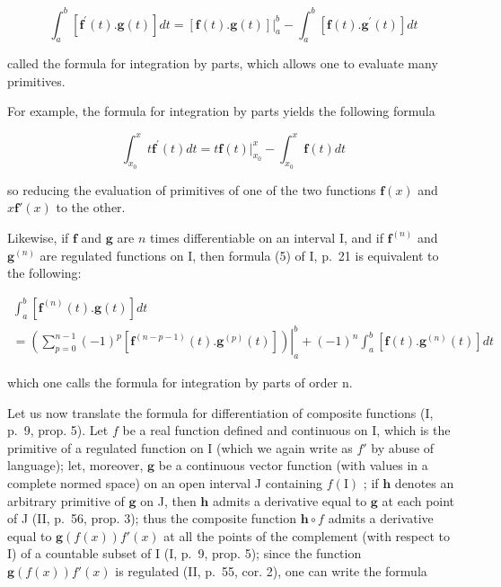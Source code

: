 \[
\int_ {a} ^ {b} [ \mathbf {f} ^ {\prime} (t). \mathbf {g} (t) ] d t = [ \mathbf {f} (t). \mathbf {g} (t) ] \big | _ {a} ^ {b} - \int_ {a} ^ {b} [ \mathbf {f} (t). \mathbf {g} ^ {\prime} (t) ] d t\tag{10}
\]

called the formula for integration by parts, which allows one to evaluate many primitives.

For example, the formula for integration by parts yields the following formula

\[
\int_ {x _ {0}} ^ {x} t \mathbf {f} ^ {\prime} (t) d t = t \mathbf {f} (t) \Big | _ {x _ {0}} ^ {x} - \int_ {x _ {0}} ^ {x} \mathbf {f} (t) d t
\]

so reducing the evaluation of primitives of one of the two functions \(\mathbf{f}(x)\) and \(x\mathbf{f}'(x)\) to the other.

Likewise, if \(\mathbf{f}\) and \(\mathbf{g}\) are \(n\) times differentiable on an interval I, and if \(\mathbf{f}^{(n)}\) and \(\mathbf{g}^{(n)}\) are regulated functions on I, then formula (5) of I, p.~21 is equivalent to the following:

\[
\begin{array}{l} \int_ {a} ^ {b} [ \mathbf {f} ^ {(n)} (t). \mathbf {g} (t) ] d t \\ = \left. \left(\sum_ {p = 0} ^ {n - 1} (- 1) ^ {p} [ \mathbf {f} ^ {(n - p - 1)} (t). \mathbf {g} ^ {(p)} (t) ]\right) \right| _ {a} ^ {b} + (- 1) ^ {n} \int_ {a} ^ {b} [ \mathbf {f} (t). \mathbf {g} ^ {(n)} (t) ] d t \end{array}\tag{11}
\]

which one calls the formula for integration by parts of order n.

Let us now translate the formula for differentiation of composite functions (I, p.~9, prop. 5). Let \(f\) be a real function defined and continuous on I, which is the primitive of a regulated function on I (which we again write as \(f'\) by abuse of language); let, moreover, \(\mathbf{g}\) be a continuous vector function (with values in a complete normed space) on an open interval J containing \(f(\mathrm{I})\) ; if \(\mathbf{h}\) denotes an arbitrary primitive of \(\mathbf{g}\) on J, then \(\mathbf{h}\) admits a derivative equal to \(\mathbf{g}\) at each point of J (II, p.~56, prop. 3); thus the composite function \(\mathbf{h} \circ f\) admits a derivative equal to \(\mathbf{g}(f(x))f'(x)\) at all the points of the complement (with respect to I) of a countable subset of I (I, p.~9, prop. 5); since the function \(\mathbf{g}(f(x))f'(x)\) is regulated (II, p.~55, cor. 2), one can write the formula

